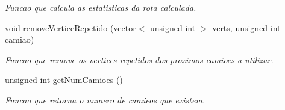 \begin{DoxyCompactItemize}
\begin{DoxyCompactList}\small\item\em Funcao que calcula as estatisticas da rota calculada. \end{DoxyCompactList}\item 
void \hyperlink{class_gestor_a9e3984e723a88a62b9daf0ac92b5d9a0}{remove\-Vertice\-Repetido} (vector$<$ unsigned int $>$ verts, unsigned int camiao)
\begin{DoxyCompactList}\small\item\em Funcao que remove os vertices repetidos dos proximos camioes a utilizar. \end{DoxyCompactList}\item 
unsigned int \hyperlink{class_gestor_a36767333693fcde43dc7a8bede31e6b2}{get\-Num\-Camioes} ()
\begin{DoxyCompactList}\small\item\em Funcao que retorna o numero de camieos que existem. \end{DoxyCompactList}\end{DoxyCompactItemize}
